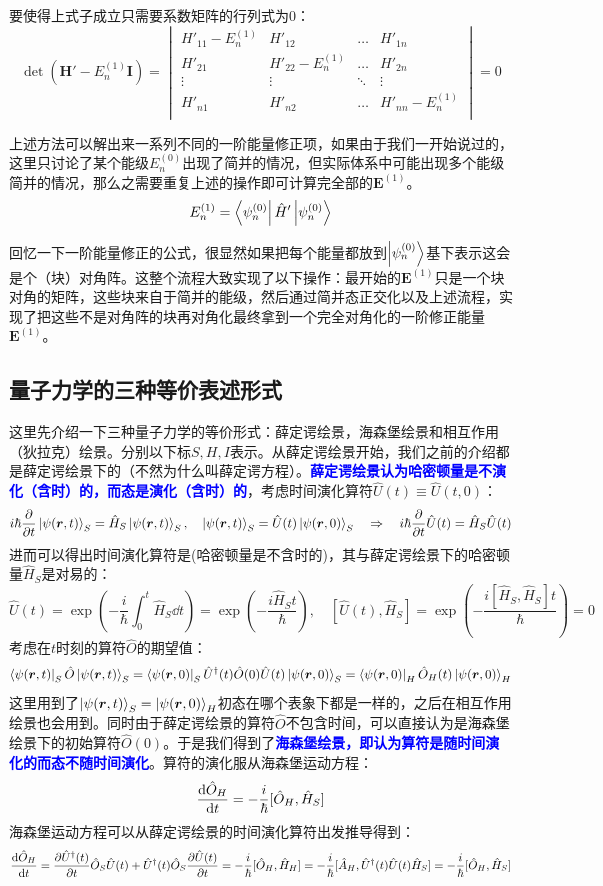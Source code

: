 要使得上式子成立只需要系数矩阵的行列式为0：
\[\det(\mathbf{H}'-E_n^{(1)}\mathbf{I})=\begin{vmatrix}
H'_{11}-E_n^{(1)} & H'_{12} & \ldots & H'_{1n}\\
H'_{21} & H'_{22}-E_n^{(1)} & \ldots & H'_{2n}\\
\vdots & \vdots & \ddots & \vdots\\
H'_{n1} & H'_{n2} & \ldots & H'_{nn}-E_n^{(1)}\\
\end{vmatrix}=0\]

上述方法可以解出来一系列不同的一阶能量修正项，如果由于我们一开始说过的，这里只讨论了某个能级$E_n^{(0)}$出现了简并的情况，但实际体系中可能出现多个能级简并的情况，那么之需要重复上述的操作即可计算完全部的$\mathbf{E}^{(1)}$。
\[E_n^{(1)}=\bra{\psi_n^{(0)}}\hat{H}'\ket{\psi_n^{(0)}}\]

回忆一下一阶能量修正的公式，很显然如果把每个能量都放到$\ket{\psi_{n}^{(0)}}$基下表示这会是个（块）对角阵。这整个流程大致实现了以下操作：最开始的$\mathbf{E}^{(1)}$只是一个块对角的矩阵，这些块来自于简并的能级，然后通过简并态正交化以及上述流程，实现了把这些不是对角阵的块再对角化最终拿到一个完全对角化的一阶修正能量$\mathbf{E}^{(1)}$。

\subsection{量子力学的三种等价表述形式}
这里先介绍一下三种量子力学的等价形式：薛定谔绘景，海森堡绘景和相互作用（狄拉克）绘景。分别以下标$S,H,I$表示。从薛定谔绘景开始，我们之前的介绍都是薛定谔绘景下的（不然为什么叫薛定谔方程）。\textcolor{blue}{\textbf{薛定谔绘景认为哈密顿量是不演化（含时）的，而态是演化（含时）的}}，考虑时间演化算符$\hat{U}(t)\equiv\hat{U}(t,0)$：
\[i\hbar\pdv{t}\ket{\psi(\bm{r},t)}_S=\hat{H}_S\ket{\psi(\bm{r},t)}_S, \quad \ket{\psi(\bm{r},t)}_S=\hat{U}(t)\ket{\psi(\bm{r},0)}_S \quad \Rightarrow \quad i\hbar\pdv{t}\hat{U}(t)=\hat{H}_S\hat{U}(t)\]
进而可以得出时间演化算符是(哈密顿量是不含时的)，其与薛定谔绘景下的哈密顿量$\hat{H}_S$是对易的：
\[\hat{U}(t)=\exp\left(-\frac{i}{\hbar}\int_{0}^{t}\hat{H}_S\dd{t}\right)=\exp\left(-\frac{i\hat{H}_St}{\hbar}\right), \quad [\hat{U}(t),\hat{H}_S]=\exp\left(-\frac{i[\hat{H}_S,\hat{H}_S]t}{\hbar}\right)=0\]
考虑在$t$时刻的算符$\hat{O}$的期望值：
\[\bra{\psi(\bm{r},t)}_S\hat{O}\ket{\psi(\bm{r},t)}_S=\bra{\psi(\bm{r},0)}_S\hat{U}^{\dagger}(t)\hat{O}(0)\hat{U}(t)\ket{\psi(\bm{r},0)}_S=\bra{\psi(\bm{r},0)}_H\hat{O}_H(t)\ket{\psi(\bm{r},0)}_H\]
这里用到了$\ket{\psi(\bm{r},t)}_S=\ket{\psi(\bm{r},0)}_H$初态在哪个表象下都是一样的，之后在相互作用绘景也会用到。同时由于薛定谔绘景的算符$\hat{O}$不包含时间，可以直接认为是海森堡绘景下的初始算符$\hat{O}(0)$。于是我们得到了\textcolor{blue}{\textbf{海森堡绘景，即认为算符是随时间演化的而态不随时间演化}}。算符的演化服从海森堡运动方程：
\[\dv{\hat{O}_H}{t}=-\frac{i}{\hbar}[\hat{O}_H,\hat{H}_S]\]
海森堡运动方程可以从薛定谔绘景的时间演化算符出发推导得到：
\[\dv{\hat{O}_H}{t}=\frac{\partial\hat{U}^{\dagger}(t)}{\partial t}\hat{O}_S\hat{U}(t)+\hat{U}^{\dagger}(t)\hat{O}_S\frac{\partial\hat{U}(t)}{\partial t}=-\frac{i}{\hbar}[\hat{O}_H,\hat{H}_H]=-\frac{i}{\hbar}[\hat{A}_H,\hat{U}^\dagger(t)\hat{U}(t)\hat{H}_S]=-\frac{i}{\hbar}[\hat{O}_H,\hat{H}_S]\]

